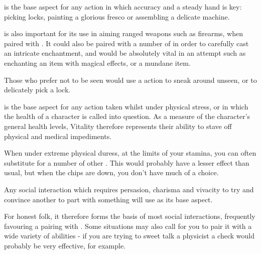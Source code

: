 

 is the base aspect for any action in which accuracy and a steady hand is key: picking locks, painting a glorious fresco or assembling a delicate machine. 

 is also important for its use in aiming ranged weapons such as firearms, when paired with . It could also be paired with a number of  in order to carefully cast an intricate enchantment, and  would be absolutely vital in an  attempt such as enchanting an item with magical effects, or  a mundane item. 

Those who prefer not to be seen would use a  action to sneak around unseen, or to delicately pick a lock. 



 is the base aspect for any action taken whilst under physical stress, or in which the health of a character is called into question. As a measure of the character's general health levels, Vitality therefore represents their ability to stave off physical and medical impediments. 

When under extreme physical duress, at the limits of your stamina, you can often substitute  for a number of other . This would probably have a lesser effect than usual, but when the chips are down, you don't have much of a choice.  



Any social interaction which requires persasion, charisma and vivacity to try and convince another to part with something will use  as its base aspect. 

For honest folk, it therefore forms the basis of most social interactions, frequently favouring a pairing with . Some situations may also call for you to pair it with a wide variety of  abilities - if you are trying to sweet talk a physicist a  check would probably be very effective, for example.

